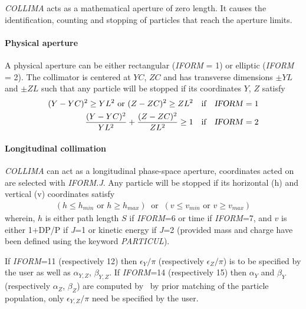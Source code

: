 \textsl{COLLIMA}  acts as a mathematical aperture of zero length.  It causes 
the identification, counting and stopping of particles that reach the aperture limits.  

\paragraph{Physical aperture}

\noindent A physical aperture can be either rectangular (\textsl{IFORM} = 1) or elliptic 
(\textsl{IFORM} = 2).  The collimator is centered at $ YC$, $ZC $ and has transverse
dimensions $\pm YL $ and $\pm ZL $ such that any particle will be
stopped if its coordinates $Y$, $Z $ satisfy
\begin{align*}
	(Y-YC)^2\geq  YL^2  \text{ or }   (Z-ZC)^2 \geq  ZL^2 
	   &   \quad \text{if}\quad  \text{\textsl{IFORM}}=1  \\
	\dfrac{ (Y-YC)^2 }{ YL^2} + \dfrac{(Z-ZC)^2 }{ ZL^2} \geq 1  
	  &   \quad \text{if}\quad  \text{\textsl{IFORM}}=2  
\end{align*}

\paragraph{Longitudinal collimation} 

\noindent \textsl{COLLIMA}  can act as a longitudinal phase-space aperture, coordinates acted on are 
selected with  \textsl{IFORM.J}. 
Any particle will be stopped  if its horizontal  (h) and vertical (v) coordinates satisfy 
\begin{align*}
	 (h \leq h_{min} \textrm{~or~} h \geq  h_{max})  ~\textrm{~or~}~  (v \leq v_{min}  \textrm{~or~}  v \geq  v_{max})
\end{align*}
wherein, $h$ is either path length $S$ if \textsl{IFORM}=6 or time  if \textsl{IFORM}=7, and 
$v$  is either 1+DP/P if \textsl{J}=1 or kinetic energy  if \textsl{J}=2 (provided mass and charge have 
been defined using the keyword \textsl{PARTICUL}). 

\noindent If \textsl{IFORM}=11 (respectively 12) then $\epsilon_Y/\pi$  (respectively $\epsilon_Z/\pi$) 
is to be specified by the user as well as $\alpha_{Y,Z}$, $\beta_{Y,Z}$. 
If \textsl{IFORM}=14 (respectively 15) then $\alpha_Y$ and  $\beta_Y$  (respectively $\alpha_Z$,  $\beta_Z$) 
are computed by \zgoubi\ by prior 
matching of the particle population, only $\epsilon_{Y,Z}/\pi$ need be specified by the user. 



